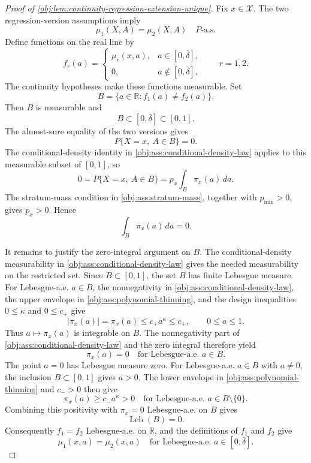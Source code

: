 \begin{proof}[Proof of \cref{obj:lem:continuity-regression-extension-unique}]
Fix \(x\in\mathcal X\).  The two regression-version assumptions imply
\[
\mu_1(X,A)=\mu_2(X,A)
\quad P\text{-a.s.}
\]%
Define functions on the real line by
\[
f_r(a)=
\begin{cases}
\mu_r(x,a),&a\in[0,\bar\delta],\\
0,&a\notin[0,\bar\delta],
\end{cases}
\qquad r=1,2.
\]%
The continuity hypotheses make these functions measurable.  Set
\[
B=\{a\in\mathbb R:f_1(a)\neq f_2(a)\}.
\]%
Then \(B\) is measurable and
\[
B\subset[0,\bar\delta]\subset[0,1].
\]%
The almost-sure equality of the two versions gives
\[
P\{X=x,\ A\in B\}=0.
\]%
The conditional-density identity in \cref{obj:ass:conditional-density-law} applies to this measurable subset of \([0,1]\), so
\[
0=P\{X=x,\ A\in B\}
=
p_x\int_B\pi_x(a)\,da.
\]%
The stratum-mass condition in \cref{obj:ass:stratum-mass}, together with \(p_{\min}>0\), gives \(p_x>0\).  Hence
\[
\int_B\pi_x(a)\,da=0.
\]%

It remains to justify the zero-integral argument on \(B\).  The conditional-density measurability in \cref{obj:ass:conditional-density-law} gives the needed measurability on the restricted set.  Since \(B\subset[0,1]\), the set \(B\) has finite Lebesgue measure.  For Lebesgue-a.e. \(a\in B\), the nonnegativity in \cref{obj:ass:conditional-density-law}, the upper envelope in \cref{obj:ass:polynomial-thinning}, and the design inequalities \(0\leq\kappa\) and \(0\leq c_+\) give
\[
|\pi_x(a)|=\pi_x(a)
\leq c_+a^\kappa
\leq c_+,
\qquad 0\leq a\leq1 .
\]%
Thus \(a\mapsto\pi_x(a)\) is integrable on \(B\).  The nonnegativity part of \cref{obj:ass:conditional-density-law} and the zero integral therefore yield
\[
\pi_x(a)=0
\quad\text{for Lebesgue-a.e. }a\in B.
\]%
The point \(a=0\) has Lebesgue measure zero.  For Lebesgue-a.e. \(a\in B\) with \(a\neq0\), the inclusion \(B\subset[0,1]\) gives \(a>0\).  The lower envelope in \cref{obj:ass:polynomial-thinning} and \(c_->0\) then give
\[
\pi_x(a)\geq c_-a^\kappa>0
\quad\text{for Lebesgue-a.e. }a\in B\setminus\{0\}.
\]%
Combining this positivity with \(\pi_x=0\) Lebesgue-a.e. on \(B\) gives
\[
\operatorname{Leb}(B)=0.
\]%
Consequently \(f_1=f_2\) Lebesgue-a.e. on \(\mathbb R\), and the definitions of \(f_1\) and \(f_2\) give
\[
\mu_1(x,a)=\mu_2(x,a)
\quad\text{for Lebesgue-a.e. }a\in[0,\bar\delta].
\]%


\end{proof}
